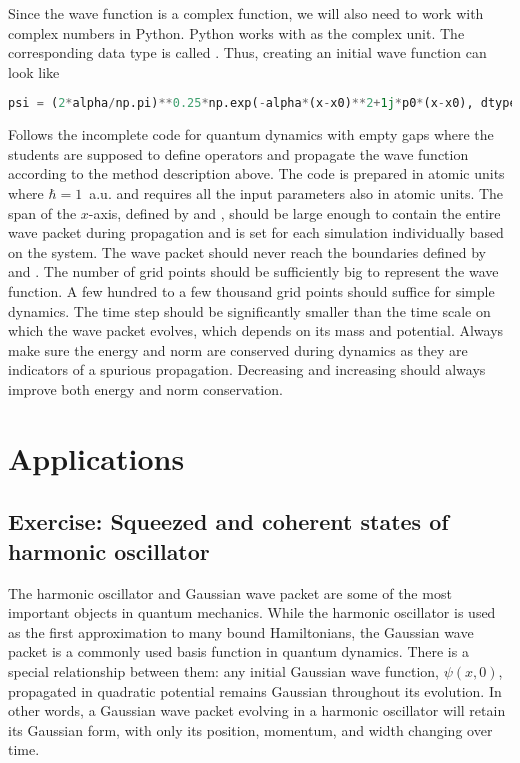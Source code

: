 Since the wave function is a complex function, we will also need to work with complex numbers in Python. Python works with  as the complex unit. The corresponding data type is called . Thus, creating an initial wave function can look like 
\begin{lstlisting}[language=Python, style=mystyle2]
psi = (2*alpha/np.pi)**0.25*np.exp(-alpha*(x-x0)**2+1j*p0*(x-x0), dtype=complex)
\end{lstlisting}

Follows the incomplete code for quantum dynamics with empty gaps where the students are supposed to define operators and propagate the wave function according to the method description above. The code is prepared in atomic units where $\hbar=1$~a.u. and requires all the input parameters also in atomic units. The span of the $x$-axis, defined by  and , should be large enough to contain the entire wave packet during propagation and is set for each simulation individually based on the system. The wave packet should never reach the boundaries defined by  and . The number of grid points should be sufficiently big to represent the wave function. A few hundred to a few thousand grid points should suffice for simple dynamics. The time step  should be significantly smaller than the time scale on which the wave packet evolves, which depends on its mass and potential. Always make sure the energy and norm are conserved during dynamics as they are indicators of a spurious propagation. Decreasing  and increasing  should always improve both energy and norm conservation. 

\lstset{style=mystyle}


\section{Applications}

\subsection*{Exercise: Squeezed and coherent states of harmonic oscillator}

The harmonic oscillator and Gaussian wave packet are some of the most important objects in quantum mechanics. While the harmonic oscillator is used as the first approximation to many bound Hamiltonians, the Gaussian wave packet is a commonly used basis function in quantum dynamics. There is a special relationship between them: any initial Gaussian wave function, $\psi(x,0)$, propagated in quadratic potential remains Gaussian throughout its evolution. In other words, a Gaussian wave packet evolving in a harmonic oscillator will retain its Gaussian form, with only its position, momentum, and width changing over time.

